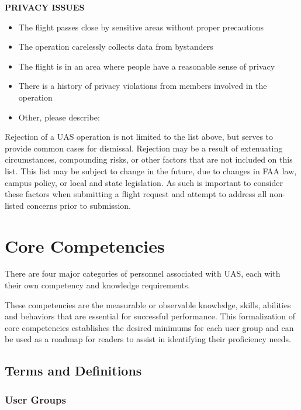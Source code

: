 \documentclass[
]{book}
\providecommand{\tightlist}{%
  \setlength{\itemsep}{0pt}\setlength{\parskip}{0pt}}
\begin{document}
\textbf{PRIVACY ISSUES}

\begin{itemize}
\tightlist
\item
  The flight passes close by sensitive areas without proper precautions
\item
  The operation carelessly collects data from bystanders
\item
  The flight is in an area where people have a reasonable sense of privacy
\item
  There is a history of privacy violations from members involved in the operation
\item
  Other, please describe:
\end{itemize}

Rejection of a UAS operation is not limited to the list above, but serves to provide common cases for dismissal. Rejection may be a result of extenuating circumstances, compounding risks, or other factors that are not included on this list. This list may be subject to change in the future, due to changes in FAA law, campus policy, or local and state legislation. As such is important to consider these factors when submitting a flight request and attempt to address all non-listed concerns prior to submission.

\hypertarget{ch-core-competencies}{%
\chapter{Core Competencies}\label{ch-core-competencies}}

There are four major categories of personnel associated with UAS, each with their own competency and knowledge requirements.

These competencies are the measurable or observable knowledge, skills, abilities and behaviors that are essential for successful performance. This formalization of core competencies establishes the desired minimums for each user group and can be used as a roadmap for readers to assist in identifying their proficiency needs.

\hypertarget{terms-and-definitions}{%
\section{Terms and Definitions}\label{terms-and-definitions}}

\hypertarget{user-groups}{%
\subsection{User Groups}\label{user-groups}}
\end{document}
